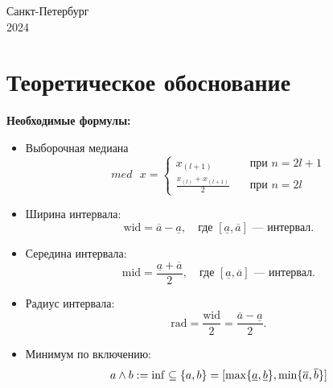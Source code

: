 \documentclass[10pt]{article}
\begin{document}
\begin{titlepage}
\vspace{\fill}

\begin{center}

Санкт-Петербург \\2024

\end{center}

\end{titlepage}

\tableofcontents\newpage

\section{Теоретическое обоснование}
\textbf{Необходимые формулы:}
\begin{itemize}
\item Выборочная медиана
 \begin{equation*}
 med \text{ } x=\begin{cases}
    x_{(l+1)}      & \quad \text{при } n = 2l+1 \\
    \frac{x_{(l)}+x_{(l+1)}}{2} & \quad \text{при } n = 2l
  \end{cases}
 \end{equation*}

\item Ширина интервала:
\begin{equation}
    \text{wid} = \overline{a} - \underline{a}, \quad \text{где } [\underline{a}, \overline{a}] \text{ — интервал}.
\end{equation}

\item Середина интервала:
\begin{equation}
    \text{mid} = \frac{\underline{a} + \overline{a}}{2}, \quad \text{где } [\underline{a}, \overline{a}] \text{ — интервал}.
\end{equation}

\item Радиус интервала:
\begin{equation}
    \text{rad} = \frac{\text{wid}}{2} = \frac{\overline{a} - \underline{a}}{2}.
\end{equation}

\item Минимум по включению:
\begin{equation}
    a \wedge b := \inf \subseteq \{ a, b \} = [\max\{\underline{a}, \underline{b}\}, \min\{\overline{a}, \overline{b}\}] \\
\end{equation}


\end{itemize}
\end{document}

